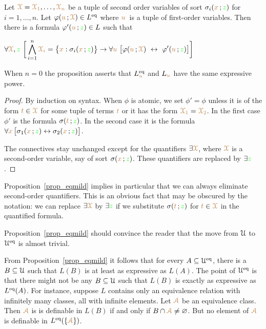 \documentclass[creche.tex]{subfiles}
\begin{document}
\begin{proposition}\label{prop_eqmild}
Let ${\color{brown}\EuScript X}={\color{brown}\EuScript X_1},\dots,{\color{brown}\EuScript X_n}$ be a tuple of second order variables of sort $\sigma_i({\color{brown} x}\,;{\color{green} z})$ for $i=1,\dots,n$. Let $\varphi({\color{brown} u}\,;{\color{brown}\EuScript X})\in L^{{\rm eq}}$ where ${\color{brown} u}\,$ is a tuple of first-order variables. Then there is a formula $\varphi'({\color{brown} u}\,;{\color{green} z})\in L$ such that 

\hfil$\displaystyle\A {\vl\X},{\gr z}\ \bigg[\bigwedge^n_{i=1}{\vl\X_i}=\big\{{\mr x}:\sigma_i({\mr x}\,;{\gr z})\big\}\imp\A {\mr u}\ \big[\phi({\mr u}\,;{\vl\X})\ \iff\ \phi'({\mr u}\,;{\gr z})\big]\bigg]$

\end{proposition}

When $n=0$ the proposition asserts that $L_{{\color{brown} u}}^{{\rm eq}}$ and $L_{{\color{brown} u}}$ have the same expressive power.

\begin{proof}
By induction on syntax. When $\phi$ is atomic, we set $\phi'=\phi$ unless it is of the form ${\color{brown} t}\in {\color{brown}\EuScript X}$ for some tuple of terms ${\color{brown} t}$ or it has the form ${\color{brown}\EuScript X_1}={\color{brown}\EuScript X_2}$. In the first case $\phi'$ is the formula $\sigma({\color{brown} t}\,;{\color{green} z})$. In the second case it is the formula $\forall {\color{brown}x}\,\big[\sigma_1({\color{brown} x}\,;{\color{green} z}) \leftrightarrow\sigma_2({\color{brown} x}\,;{\color{green} z})\big]$.

The connectives stay unchanged except for the quantifiers $\exists {\color{brown}\EuScript X}$, where ${\color{brown}\EuScript X}$ is a second-order variable, say of sort $\sigma({\color{brown} x}\,;{\color{green} z})$. These quantifiers are replaced by $\exists{\color{green}z}$.
\end{proof}

Proposition~\ref{prop_eqmild} implies in particular that we can always eliminate second-order quantifiers. This is an obvious fact that may be obscured by the notation: we can replace $\exists {\color{brown}\EuScript X}$ by $\exists {\color{green}z}$ if we substitute  $\sigma({\color{brown} t}\,;{\color{green} z})$ for ${\color{brown} t}\in {\color{brown}\EuScript X}$ in the quantified formula.

Proposition~\ref{prop_eqmild} should convince the reader that the move from $\EuScript U$ to $\EuScript U^{{\rm eq}}$ is almost trivial. %


\begin{remark}\label{rem_eqmild}
From Proposition~\ref{prop_eqmild} it follows that for every $A\subseteq\EuScript U^{{\rm eq}}$, there is a $B\subseteq\EuScript U$ such that $L(B)$ is at least as expressive as $L(A)$. The point of $\EuScript U^{{\rm eq}}$ is that there might not be any $B\subseteq\EuScript U$ such that $L(B)$ is exactly as expressive as $L^{{\rm eq}}(A)$. For instance, suppose $L$ contains only an equivalence relation with infinitely many classes, all with infinite elements. Let ${\color{brown}\EuScript A}$ be an equivalence class. Then ${\color{brown}\EuScript A}$ is is definable in $L(B)$ if and only if $B\cap {\color{brown}\EuScript A}\neq\varnothing$. But no element of ${\color{brown}\EuScript A}$ is definable in $L^{{\rm eq}}(\{{\color{brown}\EuScript A}\})$.\QED
\end{remark}
\end{document}
